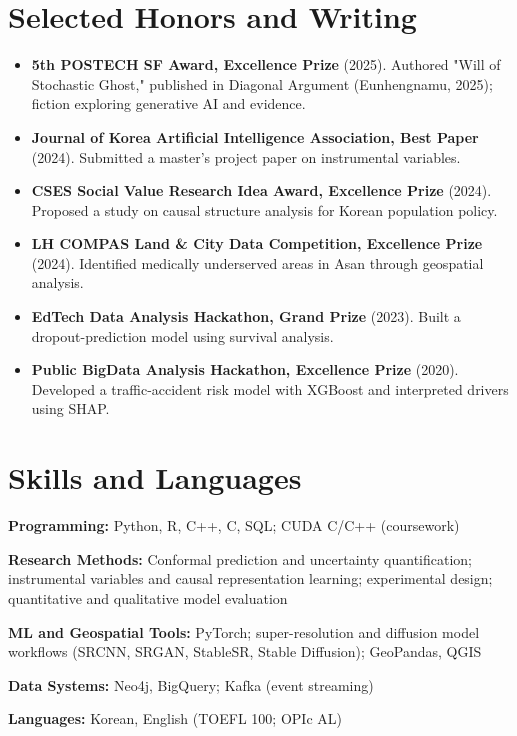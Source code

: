 \documentclass[a4paper,10pt]{article}
\begin{document}
\section{Selected Honors and Writing}
\begin{itemize}
\item \textbf{5th POSTECH SF Award, Excellence Prize} (2025). Authored "Will of Stochastic Ghost," published in Diagonal Argument (Eunhengnamu, 2025); fiction exploring generative AI and evidence.
\item \textbf{Journal of Korea Artificial Intelligence Association, Best Paper} (2024). Submitted a master's project paper on instrumental variables.
\item \textbf{CSES Social Value Research Idea Award, Excellence Prize} (2024). Proposed a study on causal structure analysis for Korean population policy.
\item \textbf{LH COMPAS Land \& City Data Competition, Excellence Prize} (2024). Identified medically underserved areas in Asan through geospatial analysis.
\item \textbf{EdTech Data Analysis Hackathon, Grand Prize} (2023). Built a dropout-prediction model using survival analysis.
\item \textbf{Public BigData Analysis Hackathon, Excellence Prize} (2020). Developed a traffic-accident risk model with XGBoost and interpreted drivers using SHAP.
\end{itemize}
\section{Skills and Languages}
\textbf{Programming:} Python, R, C++, C, SQL; CUDA C/C++ (coursework)\par
\vspace{5pt}
\textbf{Research Methods:} Conformal prediction and uncertainty quantification; instrumental variables and causal representation learning; experimental design; quantitative and qualitative model evaluation\par
\vspace{5pt}
\textbf{ML and Geospatial Tools:} PyTorch; super-resolution and diffusion model workflows (SRCNN, SRGAN, StableSR, Stable Diffusion); GeoPandas, QGIS\par
\vspace{5pt}
\textbf{Data Systems:} Neo4j, BigQuery; Kafka (event streaming)\par
\vspace{5pt}
\textbf{Languages:} Korean, English (TOEFL 100; OPIc AL)\par
\vspace{5pt}
\end{document}

